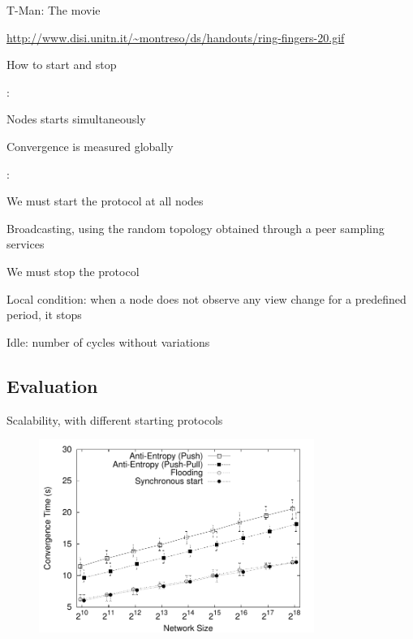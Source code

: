 \begin{frame}{T-Man: The movie}
	
\url{http://www.disi.unitn.it/~montreso/ds/handouts/ring-fingers-20.gif}

\end{frame}


\begin{frame}{How to start and stop}
	
:\\
\BIL
\item Nodes starts simultaneously
\item Convergence is measured globally
\EIL

\bigskip
{}:\\
\BIL
\item We must start the protocol at all nodes
\BI
\item Broadcasting, using the random topology obtained through a peer sampling services
\EI
\item We must stop the protocol
\BI
\item Local condition: when a node does not observe any view change for a predefined period, it stops
\item Idle: number of cycles without variations
\EI
\EIL

\end{frame}

\subsection{Evaluation}

\begin{frame}{Scalability, with different starting protocols}
	
\begin{figure}
	\includegraphics[width=0.80\textwidth]{figs/11/sort-size-ctime}
\end{figure}	
	
\end{frame}

